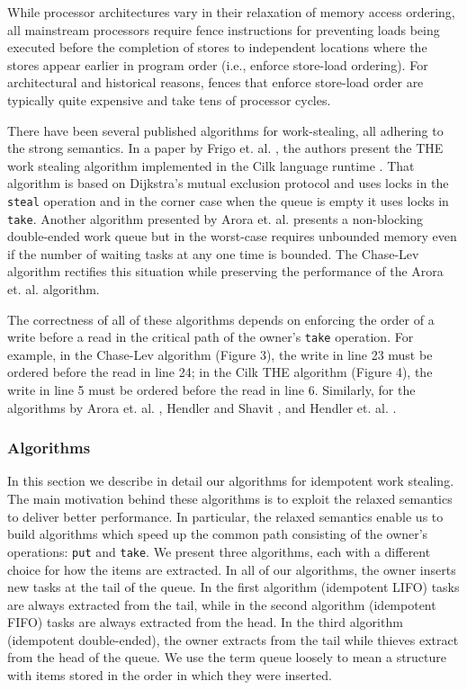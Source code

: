 While processor architectures vary in their relaxation of memory
access ordering, all mainstream processors require fence instructions
for preventing loads being executed before the completion of stores to
independent locations where the stores appear earlier in program order
(i.e., enforce store-load ordering). For architectural and historical
reasons, fences that enforce store-load order are typically quite
expensive and take tens of processor cycles.


There have been several published algorithms for work-stealing, all
adhering to the strong semantics. In a paper by Frigo
et. al. \cite{Frigo1998}, the authors present the THE work stealing
algorithm implemented in the Cilk language runtime
\cite{Blumofe1995}. That algorithm is based on Dijkstra's mutual
exclusion protocol and uses locks in the \lstinline!steal!  operation
and in the corner case when the queue is empty it uses locks in
\lstinline!take!. Another algorithm presented by Arora
et. al. \cite{Arora2001} presents a non-blocking double-ended work
queue but in the worst-case requires unbounded memory even if the
number of waiting tasks at any one time is bounded. The Chase-Lev
algorithm \cite{Chase2005} rectifies this situation while preserving
the performance of the Arora et. al. algorithm.

The correctness of all of these algorithms depends on enforcing the
order of a write before a read in the critical path of the owner's
\lstinline!take! operation. For example, in the Chase-Lev algorithm
\cite{Chase2005} (Figure 3), the write in line 23 must be ordered
before the read in line 24; in the Cilk THE algorithm \cite{Frigo1998}
(Figure 4), the write in line 5 must be ordered before the read in
line 6. Similarly, for the algorithms by Arora
et. al. \cite{Arora2001}, Hendler and Shavit \cite{Hendler2002}, and
Hendler et. al. \cite{Hendler2006}.

\subsubsection{Algorithms}


In this section we describe in detail our algorithms for idempotent
work stealing. The main motivation behind these algorithms is to
exploit the relaxed semantics to deliver better performance. In
particular, the relaxed semantics enable us to build algorithms which
speed up the common path consisting of the owner's operations:
\lstinline!put! and \lstinline!take!. We present three algorithms,
each with a different choice for how the items are extracted. In all
of our algorithms, the owner inserts new tasks at the tail of the
queue. In the first algorithm (idempotent LIFO) tasks are always
extracted from the tail, while in the second algorithm (idempotent
FIFO) tasks are always extracted from the head. In the third algorithm
(idempotent double-ended), the owner extracts from the tail while
thieves extract from the head of the queue. We use the term queue
loosely to mean a structure with items stored in the order in which
they were inserted.


